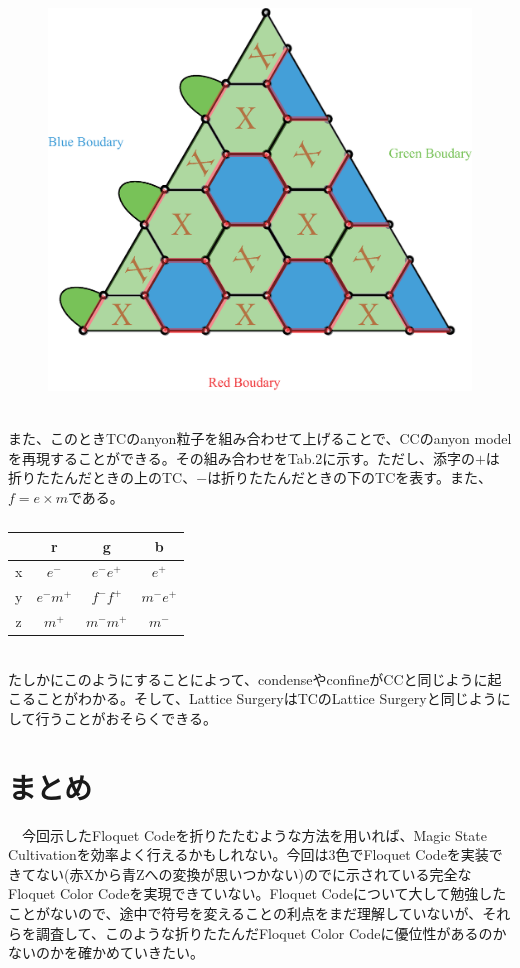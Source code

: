 \documentclass[a4paper,9pt]{ltjsarticle}
\begin{document}
  \begin{figure}[h]
    \centering
    \includegraphics[scale=0.30]{figure/figure6.eps}
    \vspace{10pt}\caption{}
    \label{figure6}
    \vspace{-15pt}
  \end{figure}\\
  また、このときTCのanyon粒子を組み合わせて上げることで、CCのanyon modelを再現することができる。その組み合わせをTab.2に示す。ただし、添字の$+$は折りたたんだときの上のTC、$-$は折りたたんだときの下のTCを表す。また、$f=e\times m$である。
  \begin{table}[h]
    \centering
    \begin{tabular}{c|c|c|c}
       & r & g & b \\
      \hline
      x & $e^-$ & $e^-e^+$ & $e^+$ \\
      \hline
      y & $e^-m^+$ & $f^-f^+$ & $m^-e^+$ \\
      \hline
      z & $m^+$ & $m^-m^+$ & $m^-$ \\
      \hline
    \end{tabular}
    \caption{}
  \end{table}\\
  たしかにこのようにすることによって、condenseやconfineがCCと同じように起こることがわかる。そして、Lattice SurgeryはTCのLattice Surgeryと同じようにして行うことがおそらくできる。

\section{まとめ}
　今回示したFloquet Codeを折りたたむような方法を用いれば、Magic State Cultivationを効率よく行えるかもしれない。今回は3色でFloquet Codeを実装できてない(赤Xから青Zへの変換が思いつかない)ので\cite{kesselring2024}に示されている完全なFloquet Color Codeを実現できていない。Floquet Codeについて大して勉強したことがないので、途中で符号を変えることの利点をまだ理解していないが、それらを調査して、このような折りたたんだFloquet Color Codeに優位性があるのかないのかを確かめていきたい。
\printbibliography
\end{document}

